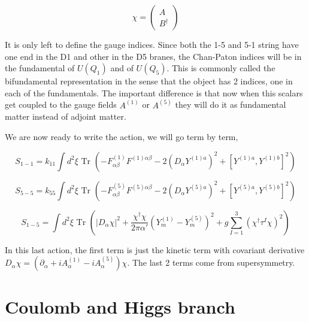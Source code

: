 \begin{equation}
    \chi=\begin{pmatrix}A\\B^\dagger\end{pmatrix}
\end{equation}

It is only left to define the gauge indices. Since both the 1-5 and 5-1 string have one end in the D1 and other in the D5 branes, the Chan-Paton indices will be in the fundamental of $U(Q_1)$ and of $U(Q_5)$. This is commonly called the bifundamental representation in the sense that the object has 2 indices, one in each of the fundamentals. The important difference is that now when this scalars get coupled to the gauge fields $A^{(1)}$ or $A^{(5)}$ they will do it as fundamental matter instead of adjoint matter.

We are now ready to write the action, we will go term by term,

\begin{equation}
    S_{1-1}=k_{11} \int d^{2}\xi\text{ Tr }(-F^{(1)}_{\alpha\beta}F^{(1) \alpha\beta}-2(D_\alpha Y^{(1)a})^2+[Y^{(1)a},Y^{(1)b}]^2)
\end{equation}

\begin{equation}
    S_{5-5}=k_{55} \int d^{2}\xi\text{ Tr }(-F^{(5)}_{\alpha\beta}F^{(5) \alpha\beta}-2(D_\alpha Y^{(5)a})^2+[Y^{(5)a},Y^{(5)b}]^2)
\end{equation}

\begin{equation}
    S_{1-5} = \int d^2\xi \text{ Tr } \left( |D_\alpha \chi|^2 + \frac{\chi^\dagger \chi}{2\pi \alpha'} (Y^{(1)}_m - Y^{(5)}_m)^2 + g \sum_{I = 1}^3 (\chi^\dagger \tau^I \chi)^2\right)
\end{equation}

In this last action, the first term is just the kinetic term with covariant derivative $D_\alpha \chi = (\partial_\alpha + i A^{(1)}_\alpha - i A^{(5)}_\alpha) \chi$. The last 2 terms come from supersymmetry.


\section{Coulomb and Higgs branch}

